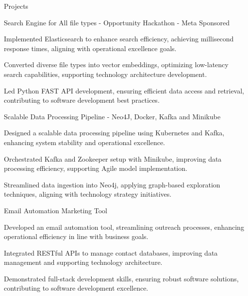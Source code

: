 \documentclass{resume} %
\begin{document}
    \begin{rSection}{Projects}
                    \begin{rSubsection}
                                    {Search Engine for All file types {-} Opportunity Hackathon {-} Meta Sponsored}
                                {\normalfont{ - }}{}{}
                                    \item Implemented Elasticsearch to enhance search efficiency, achieving millisecond response times, aligning with operational excellence goals.
                                    \item Converted diverse file types into vector embeddings, optimizing low{-}latency search capabilities, supporting technology architecture development.
                                    \item Led Python FAST API development, ensuring efficient data access and retrieval, contributing to software development best practices.
                            \end{rSubsection}
                    \begin{rSubsection}
                                    {Scalable Data Processing Pipeline {-} Neo4J, Docker, Kafka and Minikube}
                                {\normalfont{ - }}{}{}
                                    \item Designed a scalable data processing pipeline using Kubernetes and Kafka, enhancing system stability and operational excellence.
                                    \item Orchestrated Kafka and Zookeeper setup with Minikube, improving data processing efficiency, supporting Agile model implementation.
                                    \item Streamlined data ingestion into Neo4j, applying graph{-}based exploration techniques, aligning with technology strategy initiatives.
                            \end{rSubsection}
                    \begin{rSubsection}
                                    {Email Automation Marketing Tool}
                                {\normalfont{ - }}{}{}
                                    \item Developed an email automation tool, streamlining outreach processes, enhancing operational efficiency in line with business goals.
                                    \item Integrated RESTful APIs to manage contact databases, improving data management and supporting technology architecture.
                                    \item Demonstrated full{-}stack development skills, ensuring robust software solutions, contributing to software development excellence.
                            \end{rSubsection}
            \end{rSection}
\end{document}
